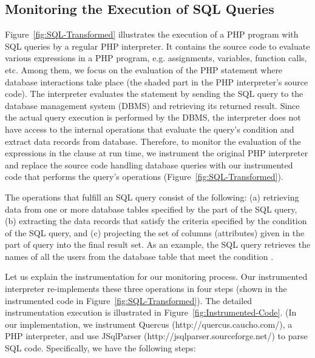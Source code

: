 \subsection{Monitoring the Execution of SQL Queries}
\label{monitoring-section}



Figure~\ref{fig:SQL-Transformed} illustrates the execution of a PHP
program with SQL queries by a regular PHP interpreter. It contains the
source code to evaluate various expressions in a PHP program, e.g.
assignments, variables, function calls, etc. Among them, we focus on
the evaluation of the PHP
 statement where database interactions take place
(the shaded part in the PHP interpreter's source code). The
interpreter evaluates the  statement by sending the
SQL query to the database management system (DBMS) and retrieving its
returned result. Since the actual query execution is performed by the
DBMS, the interpreter does not have access to the internal operations
that evaluate the query's  condition and extract data
records from database. Therefore, to monitor the evaluation of the
expressions in the
 clause at run time, we instrument the original PHP
interpreter and replace the source code handling database queries with
our instrumented code that performs the query's operations
(Figure~\ref{fig:SQL-Transformed}).




The operations that fulfill an SQL  query consist of the
following: (a) retrieving data from one or more database tables
specified by the  part of the SQL query, (b) extracting
the data records that satisfy the criteria specified by the
 condition of the SQL query, and (c) projecting the set
of columns (attributes) given in the  part of query into
the final result set. As an example, the SQL query 
 retrieves the names of all the users from the
 database table that meet the condition .


Let us explain the instrumentation for our monitoring
process. Our instrumented interpreter re-implements these three
operations in four steps (shown in the instrumented code in
Figure~\ref{fig:SQL-Transformed}). The detailed instrumentation
execution is illustrated in Figure~\ref{fig:Instrumented-Code}. (In
our implementation, we instrument Quercus
(http://quercus.caucho.\-com/), a PHP interpreter, and use JSqlParser
(http://jsqlparser.source\-forge.\-net/) to parse SQL code. Specifically,
we have the following steps:


